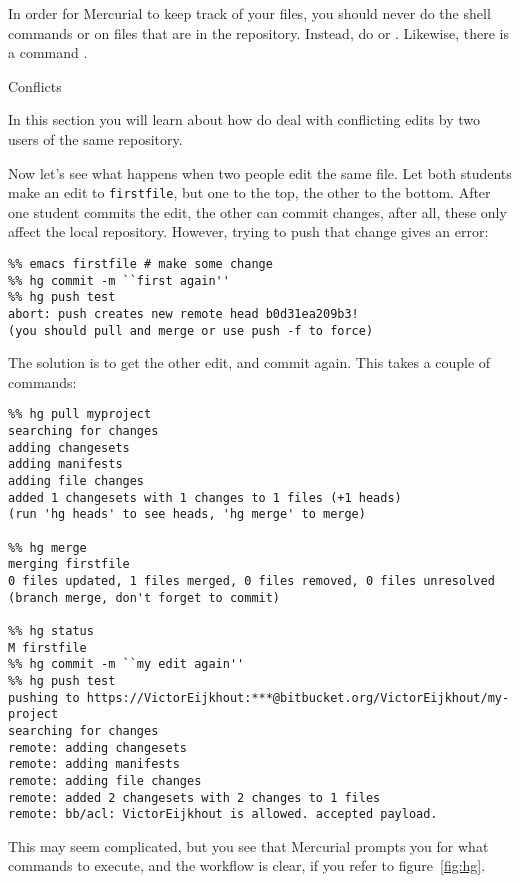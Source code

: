 
In order for Mercurial to keep track of your files, you should never do
the shell commands
 or  on files that are in the repository. Instead, do
 or . Likewise, there is a command .

 {Conflicts}

\begin{purpose}
  In this section you will learn about how do deal with conflicting
  edits by two users of the same repository.
\end{purpose}

Now let's see what happens when two people edit the same file.
Let both students make an edit to \verb+firstfile+, but one to the
top, the other to the bottom. After one student commits the edit, the
other can commit changes, after all, these only affect the local repository.
However, trying to push that change gives an error:
\begin{verbatim}
%% emacs firstfile # make some change
%% hg commit -m ``first again''
%% hg push test
abort: push creates new remote head b0d31ea209b3!
(you should pull and merge or use push -f to force)
\end{verbatim}
The solution is to get the other edit, and commit again. This takes a 
couple of commands:
\begin{verbatim}
%% hg pull myproject
searching for changes
adding changesets
adding manifests
adding file changes
added 1 changesets with 1 changes to 1 files (+1 heads)
(run 'hg heads' to see heads, 'hg merge' to merge)

%% hg merge
merging firstfile
0 files updated, 1 files merged, 0 files removed, 0 files unresolved
(branch merge, don't forget to commit)

%% hg status
M firstfile
%% hg commit -m ``my edit again''
%% hg push test
pushing to https://VictorEijkhout:***@bitbucket.org/VictorEijkhout/my-project
searching for changes
remote: adding changesets
remote: adding manifests
remote: adding file changes
remote: added 2 changesets with 2 changes to 1 files
remote: bb/acl: VictorEijkhout is allowed. accepted payload.
\end{verbatim}

This may seem complicated, but you see that Mercurial prompts you 
for what commands to execute, and the workflow is clear, if you refer
to figure~\ref{fig:hg}.

